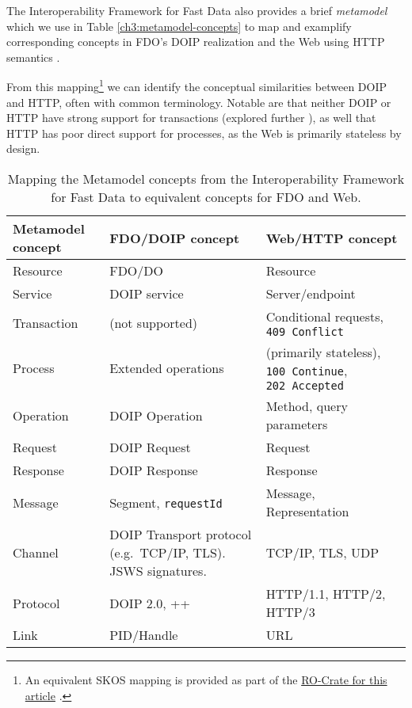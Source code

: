 The Interoperability Framework for Fast Data also provides a brief \emph{metamodel} which we use in Table \vref{ch3:metamodel-concepts} to map and examplify corresponding concepts in FDO's DOIP realization and the Web using HTTP semantics \cite{rfc9110}.

From this mapping\footnote{An equivalent SKOS mapping \cite{w3-skos-primer} is provided as part of the \href{https://w3id.org/ro/doi/10.5281/zenodo.8075229}{RO-Crate for this article} \cite{soilandreyes2023}.} we can identify the conceptual similarities between DOIP and HTTP, often with common terminology. Notable are that neither DOIP or HTTP have strong support for transactions (explored further ), as well that HTTP has poor direct support for processes, as the Web is primarily stateless by design.

\begin{table}[h!]
  \centering
  \caption[Mapping the Interoperability Framework Metamodel concepts to FDO and Web]{Mapping the Metamodel concepts from the Interoperability Framework for Fast Data \cite{delgadoInteroperabilityFrameworkDistributed2016a} to equivalent concepts for FDO and Web.
  \label{ch3:metamodel-concepts}}\tabularnewline
   \begin{tabular}{ m{5em}  m{15em} m{15em} } 
   \hline
  Metamodel concept & 
  FDO/DOIP concept & 
  Web/HTTP concept \\ 
   \hline
  Resource	  & FDO/DO	            & Resource \\
  Service	    & DOIP service	      & Server/endpoint \\
  Transaction	& (not supported)	    & Conditional requests, \texttt{409\ Conflict} \\
  Process	    & Extended operations	& (primarily stateless), \texttt{100\ Continue}, \texttt{202\ Accepted} \\
  Operation	  & DOIP Operation	    & Method, query parameters \\
  Request	    & DOIP Request	      & Request \\
  Response	  & DOIP Response	      & Response \\
  Message	    & Segment, \texttt{requestId} 
                                    & Message, Representation \\
  Channel	    & DOIP Transport protocol (e.g.~TCP/IP, TLS). JSWS signatures.
                                    & TCP/IP, TLS, UDP \\
  Protocol  	& DOIP 2.0, ++	      & HTTP/1.1, HTTP/2, HTTP/3 \\
  Link	      & PID/Handle	        & URL \\ 
   \hline
   \end{tabular}\end{table}
  

